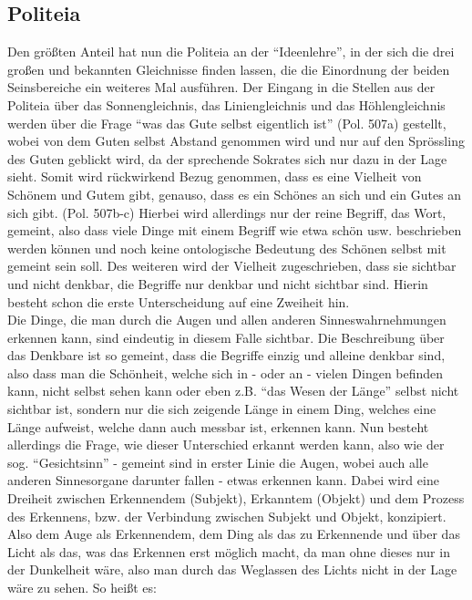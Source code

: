 \subsection{Politeia}
Den größten Anteil hat nun die Politeia an der \enquote{Ideenlehre}, in der sich die drei großen und bekannten Gleichnisse finden lassen, die die Einordnung der beiden Seinsbereiche ein weiteres Mal ausführen.
Der Eingang in die Stellen aus der Politeia über das Sonnengleichnis, das Liniengleichnis und das Höhlengleichnis werden über die Frage \enquote{was das Gute selbst eigentlich ist} (Pol. 507a) gestellt, wobei von dem Guten selbst Abstand genommen wird und nur auf den Sprössling des Guten geblickt wird, da der sprechende Sokrates sich nur dazu in der Lage sieht. Somit wird rückwirkend Bezug genommen, dass es eine Vielheit von Schönem und Gutem gibt, genauso, dass es ein Schönes an sich und ein Gutes an sich gibt. (Pol. 507b-c) Hierbei wird allerdings nur der reine Begriff, das Wort, gemeint, also dass viele Dinge mit einem Begriff wie etwa schön usw. beschrieben werden können und noch keine ontologische Bedeutung des Schönen selbst mit gemeint sein soll. Des weiteren wird der Vielheit zugeschrieben, dass sie sichtbar und nicht denkbar, die Begriffe nur denkbar und nicht sichtbar sind. Hierin besteht schon die erste Unterscheidung auf eine Zweiheit hin.\\
Die Dinge, die man durch die Augen und allen anderen Sinneswahrnehmungen erkennen kann, sind eindeutig in diesem Falle sichtbar. Die Beschreibung über das Denkbare ist so gemeint, dass die Begriffe einzig und alleine denkbar sind, also dass man die Schönheit, welche sich in - oder an - vielen Dingen befinden kann, nicht selbst sehen kann oder eben z.B. \enquote{das Wesen der Länge} selbst nicht sichtbar ist, sondern nur die sich zeigende Länge in einem Ding, welches eine Länge aufweist, welche dann auch messbar ist, erkennen kann.
Nun besteht allerdings die Frage, wie dieser Unterschied erkannt werden kann, also wie der sog. \enquote{Gesichtsinn} - gemeint sind in erster Linie die Augen, wobei auch alle anderen Sinnesorgane darunter fallen - etwas erkennen kann.
Dabei wird eine Dreiheit zwischen Erkennendem (Subjekt), Erkanntem (Objekt) und dem Prozess des Erkennens, bzw. der Verbindung zwischen Subjekt und Objekt, konzipiert. Also dem Auge als Erkennendem, dem Ding als das zu Erkennende und über das Licht als das, was das Erkennen erst möglich macht, da man ohne dieses nur in der Dunkelheit wäre, also man durch das Weglassen des Lichts nicht in der Lage wäre zu sehen. So heißt es:
